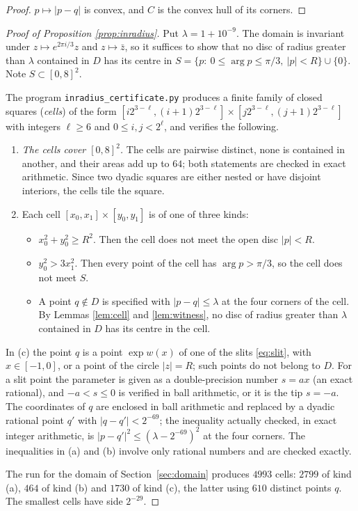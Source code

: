 \documentclass[11pt]{amsart}
\theoremstyle{remark}
\begin{document}
\begin{proof}
$p\mapsto|p-q|$ is convex, and $C$ is the convex hull of its corners.
\end{proof}

\begin{proof}[Proof of Proposition \ref{prop:inradius}]
Put $\lambda=1+10^{-9}$. The domain is invariant under $z\mapsto e^{2\pi i/3}z$ and $z\mapsto\bar z$,
so it suffices to show that no disc of radius greater than $\lambda$ contained in $D$ has its centre in
$S=\{p:\ 0\le\arg p\le\pi/3,\ |p|<R\}\cup\{0\}$. Note $S\subset[0,8]^2$.

The program \texttt{inradius\_certificate.py} produces a finite family of closed squares (\emph{cells}) of the form
$[i2^{3-\ell},(i+1)2^{3-\ell}]\times[j2^{3-\ell},(j+1)2^{3-\ell}]$ with integers $\ell\ge6$ and
$0\le i,j<2^\ell$, and verifies the following.
\begin{enumerate}[label=(\roman*),leftmargin=2.2em]
\item \emph{The cells cover $[0,8]^2$.} The cells are pairwise distinct, none is contained in another, and their
areas add up to $64$;
both statements are checked in exact arithmetic. Since two dyadic squares are either nested or have disjoint
interiors, the cells tile the square.
\item Each cell $[x_0,x_1]\times[y_0,y_1]$ is of one of three kinds:
\begin{itemize}[leftmargin=1.5em]
\item[(a)] $x_0^2+y_0^2\ge R^2$. Then the cell does not meet the open disc $|p|<R$.
\item[(b)] $y_0^2>3x_1^2$. Then every point of the cell has $\arg p>\pi/3$, so the cell does not meet $S$.
\item[(c)] A point $q\notin D$ is specified with $|p-q|\le\lambda$ at the four corners of the cell. By
Lemmas \ref{lem:cell} and \ref{lem:witness}, no disc of radius greater than $\lambda$ contained in $D$ has its
centre in the cell.
\end{itemize}
\end{enumerate}
In (c) the point $q$ is a point $\exp w(x)$ of one of the slits \eqref{eq:slit}, with $x\in[-1,0]$, or a point of
the circle $|z|=R$; such points do not belong to $D$. For a slit point the parameter is given as a
double-precision number $s=ax$ (an exact rational), and $-a<s\le0$ is verified in ball arithmetic, or it is the
tip $s=-a$. The coordinates of $q$ are enclosed in ball arithmetic and replaced by a dyadic rational point $q'$
with $|q-q'|<2^{-69}$; the inequality actually checked, in exact integer arithmetic, is
$|p-q'|^2\le(\lambda-2^{-69})^2$ at the four corners. The inequalities in (a) and (b) involve only rational numbers and are checked exactly.

The run for the domain of Section~\ref{sec:domain} produces $4993$ cells: $2799$ of kind (a), $464$ of kind (b)
and $1730$ of kind (c), the latter using $610$ distinct points $q$. The smallest cells have side $2^{-29}$.
\end{proof}
\end{document}
